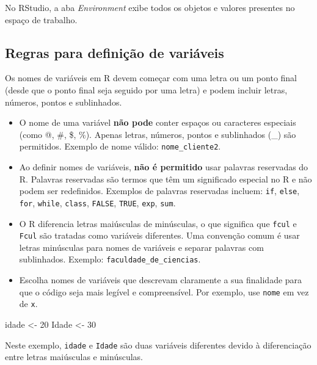 \documentclass[
]{book}
\newenvironment{Shaded}{\begin{snugshade}}{\end{snugshade}}
\newcommand{\DecValTok}[1]{\textcolor[rgb]{0.00,0.00,0.81}{#1}}
\newcommand{\NormalTok}[1]{#1}
\newcommand{\OtherTok}[1]{\textcolor[rgb]{0.56,0.35,0.01}{#1}}
\begin{document}
No RStudio, a aba \emph{Environment} exibe todos os objetos e valores
presentes no espaço de trabalho.

\subsection{Regras para definição de variáveis}\label{regras-para-definiuxe7uxe3o-de-variuxe1veis}

Os nomes de variáveis em R devem começar com uma letra ou um ponto final
(desde que o ponto final seja seguido por uma letra) e podem incluir
letras, números, pontos e sublinhados.

\begin{itemize}
\item
  O nome de uma variável \textbf{não pode} conter espaços ou caracteres
  especiais (como @, \#, \$, \%). Apenas letras, números, pontos e
  sublinhados (\_) são permitidos. Exemplo de nome válido:
  \texttt{nome\_cliente2}.
\item
  Ao definir nomes de variáveis, \textbf{não é permitido} usar palavras
  reservadas do R. Palavras reservadas são termos que têm um
  significado especial no R e não podem ser redefinidos. Exemplos de
  palavras reservadas incluem: \texttt{if}, \texttt{else}, \texttt{for}, \texttt{while}, \texttt{class},
  \texttt{FALSE}, \texttt{TRUE}, \texttt{exp}, \texttt{sum}.
\item
  O R diferencia letras maiúsculas de minúsculas, o que significa que
  \texttt{fcul} e \texttt{Fcul} são tratadas como variáveis diferentes. Uma
  convenção comum é usar letras minúsculas para nomes de variáveis e
  separar palavras com sublinhados. Exemplo: \texttt{faculdade\_de\_ciencias}.
\item
  Escolha nomes de variáveis que descrevam claramente a sua finalidade
  para que o código seja mais legível e compreensível. Por exemplo,
  use \texttt{nome} em vez de \texttt{x}.
\end{itemize}

\begin{Shaded}
\begin{Highlighting}[]
\NormalTok{idade }\OtherTok{\textless{}{-}} \DecValTok{20}
\NormalTok{Idade }\OtherTok{\textless{}{-}} \DecValTok{30}
\end{Highlighting}
\end{Shaded}

Neste exemplo, \texttt{idade} e \texttt{Idade} são duas variáveis diferentes devido à
diferenciação entre letras maiúsculas e minúsculas.
\end{document}
